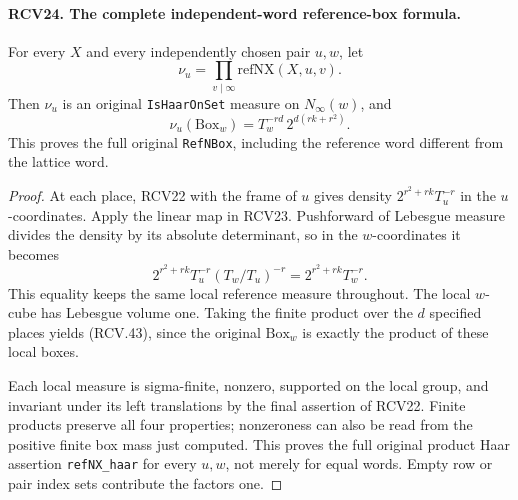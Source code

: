 \documentclass[11pt,a4paper]{article}
\numberwithin{equation}{section}
\theoremstyle{remark}\newtheorem{remark}[theorem]{Remark}
\begin{document}
\paragraph{RCV24. The complete independent-word reference-box formula.}
\label{claim:RCV24}
For every \(X\) and every independently chosen pair \(u,w\),
let
\[
 \nu_u=\prod_{v\mid\infty}\mathrm{refNX}(X,u,v).
\]
Then \(\nu_u\) is an original \texttt{Is\allowbreak Haar\allowbreak On\allowbreak Set} measure
on \(N_\infty(w)\), and
\[
       \nu_u(\mathrm{Box}_w)
                 =T_w^{-rd}\,2^{d(rk+r^2)}.
\tag{RCV.43}
\]
This proves the full original \texttt{Ref\allowbreak NBox}, including the
reference word different from the lattice word.
\begin{proof}
At each place, RCV22 with the frame of \(u\) gives density
\(2^{r^2+rk}T_u^{-r}\) in the \(u\)-coordinates.  Apply
the linear map in RCV23.  Pushforward of Lebesgue measure divides
the density by its absolute determinant, so in the
\(w\)-coordinates it becomes
\[
 2^{r^2+rk}T_u^{-r}(T_w/T_u)^{-r}
                              =2^{r^2+rk}T_w^{-r}.
\]
This equality keeps the same local reference measure throughout.
The local \(w\)-cube has Lebesgue volume one.  Taking the finite
product over the \(d\) specified places yields (RCV.43), since
the original \(\mathrm{Box}_w\) is exactly the product of these
local boxes.

Each local measure is sigma-finite, nonzero, supported on the local
group, and invariant under its left translations by the final
assertion of RCV22.  Finite products preserve all four properties;
nonzeroness can also be read from the positive finite box mass just
computed.  This proves the full original product Haar assertion
\texttt{ref\allowbreak NX\_\allowbreak haar} for every \(u,w\), not merely for equal
words.  Empty row or pair index sets contribute the factors one.
\end{proof}

\end{document}
